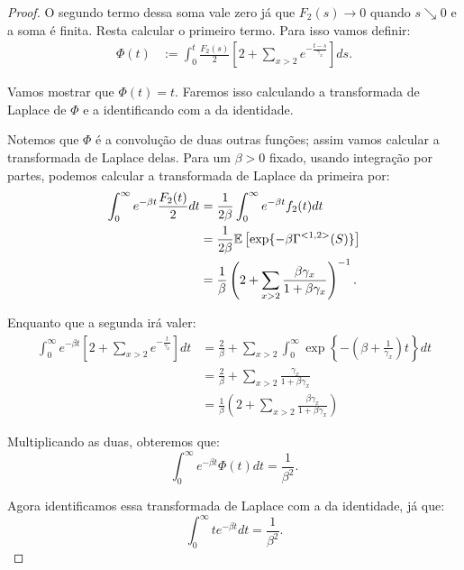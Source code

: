 \begin{proof}
  O segundo termo dessa soma vale zero já que $F_2(s) \to 0$ quando $s
  \searrow 0$ e a soma é finita. Resta calcular o primeiro termo. Para
  isso vamos definir:
  \begin{align*}
    \Phi(t) &:= \int_0^t \frac{F_2(s)}{2} \left[
      2 + \sum_{x > 2} e^{-\frac{t-s}{\gamma_x}}
    \right] ds.
  \end{align*}

  Vamos mostrar que $\Phi(t) = t$. Faremos isso calculando a
  transformada de Laplace de $\Phi$ e a identificando com a da
  identidade.

  Notemos que $\Phi$ é a convolução de duas outras funções; assim
  vamos calcular a transformada de Laplace delas. Para um $\beta > 0$
  fixado, usando integração por partes, podemos calcular a
  transformada de Laplace da primeira por:
  \begin{align*}
    \int_0^{\infty} e^{-\beta t} \frac{F_2(t)}{2} dt 
    &= \frac{1}{2 \beta} \int_0^\infty e^{-\beta t}  f_2(t) dt\\
    &= \frac{1}{2 \beta}
    {\mathbb{E}} \left[ \exp \{-\beta \Gamma^{<1,2>} (S)\}  \right]\\
    &= \frac{1}{\beta}
    \left( 2 + \sum_{x > 2}
      \frac{\beta\gamma_x}{1 + \beta \gamma_x}  \right)^{-1}.
  \end{align*}

  Enquanto que a segunda irá valer:
  \begin{align*}
    \int_0^{\infty} e^{-\beta t} \left[
      2 + \sum_{x > 2} e^{-\frac{t}{\gamma_x}}
    \right]  dt 
    &= \frac{2}{\beta} + \sum_{x > 2} \int_0^\infty \exp \left\{
      - \left(\beta + \frac{1}{\gamma_x} \right) t \right\} dt\\
    &= \frac{2}{\beta} + \sum_{x > 2} \frac{\gamma_x}{1 +
      \beta\gamma_x}\\
    &= \frac{1}{\beta} \left(
      2 + \sum_{x > 2} \frac{\beta\gamma_x}{1 +
      \beta\gamma_x}
    \right)
  \end{align*}

  Multiplicando as duas, obteremos que:
  \begin{displaymath}
    \int_0^\infty e^{- \beta t} \Phi(t) dt = \frac{1}{\beta^2}.
  \end{displaymath}

  Agora identificamos essa transformada de Laplace com a da
  identidade, já que:
  \begin{displaymath}
    \int_0^\infty t e^{- \beta t}  d t = \frac{1}{\beta^2}.
  \end{displaymath}



\end{proof}
